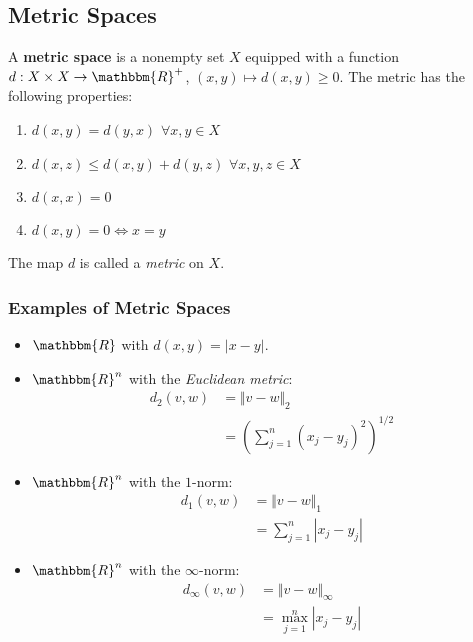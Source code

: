 \documentclass[10pt]{extarticle}
\newcommand{\R}{\mathbbm{R}}
\begin{document}
  \subsection{Metric Spaces}%
    A \textbf{metric space} is a nonempty set $X$ equipped with a function $d: X\times X \rightarrow \R^+$, $(x,y)\mapsto d(x,y) \geq 0$. The metric has the following properties:
    \begin{enumerate}[(1)]
      \item $d(x,y) = d(y,x)$ $\forall x,y\in X$
      \item $d(x,z) \leq d(x,y) + d(y,z)$ $\forall x,y,z\in X$
      \item $d(x,x) = 0$
      \item $d(x,y) = 0 \Leftrightarrow x=y$
    \end{enumerate}
    The map $d$ is called a \textsl{metric} on $X$.\\

    \subsubsection{Examples of Metric Spaces}%
    \begin{itemize}
      \item $\R$ with $d(x,y) = |x-y|$.
      \item $\R^n$ with the \textsl{Euclidean metric}:
        \begin{align*}
          d_2(v,w) &= \Vert v - w \Vert_2\\
                   &= \left(\sum_{j=1}^{n}(x_j-y_j)^2\right)^{1/2}
        \end{align*}
      \item $\R^n$ with the $1$-norm:
        \begin{align*}
          d_1(v,w) &= \Vert v-w\Vert_1\\
                   &= \sum_{j=1}^{n} |x_j-y_j|
        \end{align*}
      \item $\R^n$ with the $\infty$-norm:
        \begin{align*}
          d_{\infty}(v,w) &= \Vert v-w\Vert_{\infty}\\
                          &= \max_{j=1}^{n} |x_j-y_j|
        \end{align*}
    \end{itemize}
\end{document}
